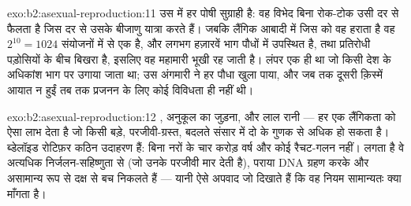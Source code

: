 \begin{solution}{exo:b2:asexual-reproduction:11}
उस  में हर पोषी सुग्राही है: वह विभेद बिना रोक-टोक उसी दर से फैलता
है जिस दर से उसके बीजाणु यात्रा करते हैं। जबकि लैंगिक आबादी में
जिस  को वह हराता है वह $2^{10} = 1024$ संयोजनों में से एक है,
और लगभग हज़ारवें भाग पौधों में उपस्थित है, तथा प्रतिरोधी पड़ोसियों के
बीच बिखरा है, इसलिए वह महामारी भूखी रह जाती है। लंपर एक ही
 था जो किसी देश के अधिकांश भाग पर उगाया जाता था; उस अंगमारी ने हर
पौधा खुला पाया, और जब तक दूसरी क़िस्में आयात न हुईं तब तक प्रजनन के लिए
कोई विविधता ही नहीं थी।
\end{solution}

\begin{solution}{exo:b2:asexual-reproduction:12}
, अनुकूल  का जुड़ना, और
लाल रानी --- हर एक लैंगिकता को ऐसा लाभ देता है जो किसी बड़े,
परजीवी-ग्रस्त, बदलते संसार में दो के गुणक से अधिक हो सकता है। ब्डेलॉइड
रोटिफ़र कठिन उदाहरण हैं: बिना नरों के चार करोड़ वर्ष और कोई रैचट-गलन
नहीं। लगता है वे अत्यधिक निर्जलन-सहिष्णुता से (जो उनके परजीवी मार देती
है), पराया DNA ग्रहण करके और असामान्य रूप से दक्ष  से बच निकलते
हैं --- यानी ऐसे अपवाद जो दिखाते हैं कि वह नियम सामान्यतः क्या माँगता है।
\end{solution}

